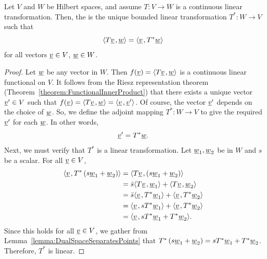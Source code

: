\begin{theorem}
Let $V$ and $W$ be Hilbert spaces, and assume $T \colon V \rightarrow W$ is a continuous linear transformation.
Then, the  is the unique bounded linear transformation $T^* \colon W \to V$ such that
\begin{equation*}
{\left\langle  T \underline{v}  \mskip2mu ,  \underline{w}  \right\rangle}
= {\left\langle  \underline{v}  \mskip2mu ,  T^* \underline{w}  \right\rangle}
\end{equation*}
for all vectors $\underline{v} \in V$, $\underline{w} \in W$.
\end{theorem}
\begin{proof}
Let $\underline{w}$ be any vector in $W$.
Then $f(\underline{v}) = {\left\langle  T \underline{v}  \mskip2mu ,  \underline{w}  \right\rangle}$ is a continuous linear functional on $V$.
It follows from the Riesz representation theorem (Theorem~\ref{theorem:FunctionalInnerProduct}) that there exists a unique vector $\underline{v}' \in V$ such that $f(\underline{v}) = {\left\langle  T \underline{v}  \mskip2mu ,  \underline{w}  \right\rangle} = {\left\langle  \underline{v}  \mskip2mu ,  \underline{v}'  \right\rangle}$.
Of course, the vector $\underline{v}'$ depends on the choice of $\underline{w}$.
So, we define the adjoint mapping $T^* \colon W \rightarrow V$ to give the required $\underline{v}'$ for each $\underline{w}$.
In other words,
\begin{equation*}
\underline{v}' = T^* \underline{w} .
\end{equation*}
Next, we must verify that $T^*$ is a linear transformation.
Let $\underline{w}_1, \underline{w}_2$ be in $W$ and $s$ be a scalar.
For all $\underline{v} \in V$,
\begin{equation*}
\begin{split}
{\left\langle  \underline{v}  \mskip2mu ,  T^* \left( s \underline{w}_1 + \underline{w}_2 \right)  \right\rangle}
&= {\left\langle  T \underline{v}  \mskip2mu ,  \left( s \underline{w}_1 + \underline{w}_2 \right)  \right\rangle} \\
&= \bar{s} {\left\langle  T \underline{v}  \mskip2mu ,  \underline{w}_1  \right\rangle}
+ {\left\langle  T \underline{v}  \mskip2mu ,  \underline{w}_2  \right\rangle} \\
&= \bar{s} {\left\langle  \underline{v}  \mskip2mu ,  T^* \underline{w}_1  \right\rangle}
+ {\left\langle  \underline{v}  \mskip2mu ,  T^* \underline{w}_2  \right\rangle} \\
&= {\left\langle  \underline{v}  \mskip2mu ,  s T^* \underline{w}_1  \right\rangle}
+ {\left\langle  \underline{v}  \mskip2mu ,  T^* \underline{w}_2  \right\rangle} \\
&= {\left\langle  \underline{v}  \mskip2mu ,  s T^* \underline{w}_1 + T^* \underline{w}_2  \right\rangle} .
\end{split}
\end{equation*}
Since this holds for all $\underline{v} \in V$, we gather from Lemma~\ref{lemma:DualSpaceSeparatesPoints} that $T^* \left( s \underline{w}_1 + \underline{w}_2 \right) = s T^* \underline{w}_1 + T^* \underline{w}_2$.
Therefore, $T^*$ is linear.


\end{proof}
